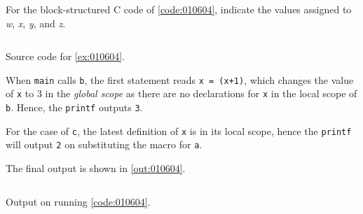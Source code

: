 \begin{exercise}\label{ex:010604}
    For the block-structured C code of \cref{code:010604}, indicate the values assigned to 
    \textit{w}, \textit{x}, \textit{y}, and \textit{z}.
    \begin{listing}[!ht]
        \inputminted[linenos=true,frame=single]{c}{01/06/04/ex010604.c}
        \caption{Source code for \cref{ex:010604}.}
        \label{code:010604}
    \end{listing}
\end{exercise}
\begin{solution}\label{sol:010604}
    When \texttt{main} calls \texttt{b}, the first statement reads 
    \texttt{x = (x+1)}, which changes the value of \texttt{x} to 3 in the 
    \textit{global scope} as there are no declarations for \texttt{x} in the
    local scope of \texttt{b}. Hence, the \texttt{printf} outputs \texttt{3}.

    \noindent For the case of \texttt{c}, the latest definition of \texttt{x}
    is in its local scope, hence the \texttt{printf} will output \texttt{2} on
    substituting the macro for \texttt{a}.

    \noindent The final output is shown in \cref{out:010604}.
    \begin{listing}[!ht]
        \inputminted[linenos=true,frame=single]{c}{01/06/04/ex010604.txt}
        \caption{Output on running \cref{code:010604}.}
        \label{out:010604}
    \end{listing}
\end{solution}